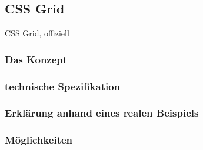 \hypertarget{css-grid}{%
\subsection{CSS Grid}\label{css-grid}}

CSS Grid, offiziell

\hypertarget{das-konzept}{%
\subsubsection{Das Konzept}\label{das-konzept}}

\hypertarget{technische-spezifikation}{%
\subsubsection{technische
Spezifikation}\label{technische-spezifikation}}

\hypertarget{erkluxe4rung-anhand-eines-realen-beispiels}{%
\subsubsection{Erklärung anhand eines realen
Beispiels}\label{erkluxe4rung-anhand-eines-realen-beispiels}}

\begin{Shaded}
\begin{Highlighting}[]
\NormalTok{\{}
  \NormalTok{: }\NormalTok{;}
\NormalTok{\}}
\end{Highlighting}
\end{Shaded}

\hypertarget{muxf6glichkeiten}{%
\subsubsection{Möglichkeiten}\label{muxf6glichkeiten}}
